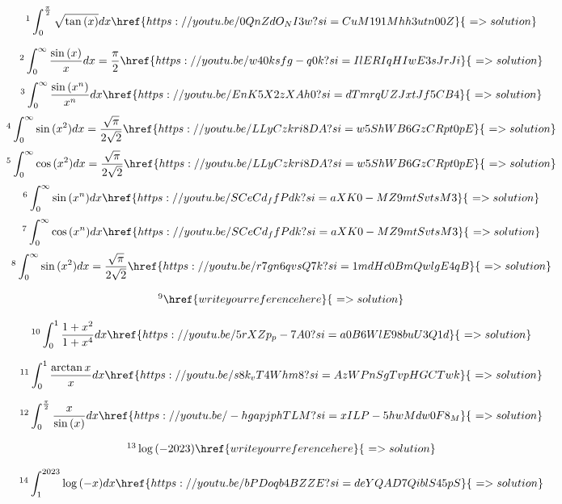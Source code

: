 \documentclass[12pt]{article}
\begin{document}
\[ \footnote{Best application of Beta Gamma Function } \int_0^{\frac{\pi}{2}} \sqrt{\tan{(x)}} dx \href{https://youtu.be/0QnZdO_NI3w?si=CuM191Mhh3utn00Z}{\,\,=>solution}   \]

\[ \footnote{Proof of Dirichlet Integral} \int_0^{\infty}  \frac{\sin{(x)}}{x} dx = \frac{\pi}{2}\href{https://youtu.be/w40ksfg-q0k?si=IlERIqHIwE3sJrJi}{\,\,=>solution}   \]
\[ \footnote{Proof of Generalized Dirichlet Integral} \int_{0}^{\infty} \frac{\sin{(x^n)}}{x^n} dx \href{https://youtu.be/EnK5X2zXAh0?si=dTmrqUZJxtJf5CB4}{\,\,=>solution}   \]
\[ \footnote{ Easiest way to prove Fresnel Integrals using Beta Gamma Functions} \int_0^{\infty} \sin{(x^2)} dx = \frac{\sqrt{\pi}}{2\sqrt{2}} \href{https://youtu.be/LLyCzkri8DA?si=w5ShWB6GzCRpt0pE}{\,\,=>solution}   \]
\[ \footnote{ Easiest way to prove Fresnel Integrals using Beta Gamma Functions} \int_0^{\infty} \cos{(x^2)} dx = \frac{\sqrt{\pi}}{2\sqrt{2}} \href{https://youtu.be/LLyCzkri8DA?si=w5ShWB6GzCRpt0pE}{\,\,=>solution}   \]
\[ \footnote{Generalized Fresnel Integral-i}  \int_0^{\infty} \sin{(x^n)} dx \href{https://youtu.be/SCeCd_ffPdk?si=aXK0-MZ9mtSvtsM3}{\,\,=>solution}   \]
\[ \footnote{Generalized Fresnel Integral-i}  \int_0^{\infty} \cos{(x^n)} dx \href{https://youtu.be/SCeCd_ffPdk?si=aXK0-MZ9mtSvtsM3}{\,\,=>solution}   \]
\[ \footnote{Solving Fresnel Integral from Laplace Transform} \int_0^{\infty} \sin{(x^2)} dx = \frac{\sqrt{\pi}}{2\sqrt{2}} \href{https://youtu.be/r7gn6qvsQ7k?si=1mdHc0BmQwlgE4qB}{\,\,=>solution}   \]

\[ \footnote{ Solving 20 integrals by Feynman Technique} \href{write your reference here}{\,\,=>solution}   \]

\[ \footnote{Another easy integral from MIT Integration Bee} \int_0^1 \frac{1+x^2}{1+x^4} dx  \href{https://youtu.be/5rXZp_p-7A0?si=a0B6WlE98buU3Q1d}{\,\,=>solution}   \]

\[ \footnote{The Catalan Integral} \int_0^1 \frac{\arctan{x}}{x} dx  \href{https://youtu.be/s8k_vT4Whm8?si=AzWPnSgTvpHGCTwk}{\,\,=>solution}   \]

\[ \footnote{Not the Dirichlet Integral} \int_0^{\frac{\pi}{2}} \frac{x}{\sin{(x)}} dx  \href{https://youtu.be/-hgapjphTLM?si=xILP-5hwMdw0F8_M}{\,\,=>solution}   \]

\[ \footnote{Shorts: What is log{(-2023)} ? } \log{(-2023)}  \href{write your reference here}{\,\,=>solution}  \] 

\[ \footnote{Let's go to Complex World } \int_1^{2023} \log{(-x)} dx \href{https://youtu.be/bPDoqb4BZZE?si=deYQAD7QiblS45pS}{\,\,=>solution}   \]
\end{document}
